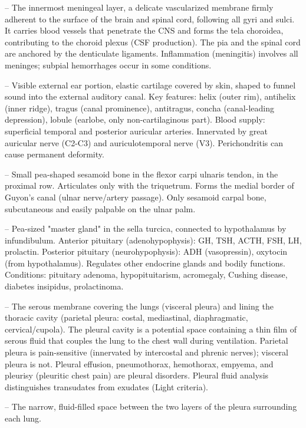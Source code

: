 -- The innermost meningeal layer, a delicate vascularized membrane firmly adherent to the surface of the brain and spinal cord, following all gyri and sulci. It carries blood vessels that penetrate the CNS and forms the tela choroidea, contributing to the choroid plexus (CSF production). The pia and the spinal cord are anchored by the denticulate ligaments. Inflammation (meningitis) involves all meninges; subpial hemorrhages occur in some conditions.

-- Visible external ear portion, elastic cartilage covered by skin, shaped to funnel sound into the external auditory canal. Key features: helix (outer rim), antihelix (inner ridge), tragus (canal prominence), antitragus, concha (canal-leading depression), lobule (earlobe, only non-cartilaginous part). Blood supply: superficial temporal and posterior auricular arteries. Innervated by great auricular nerve (C2-C3) and auriculotemporal nerve (V3). Perichondritis can cause permanent deformity.

-- Small pea-shaped sesamoid bone in the flexor carpi ulnaris tendon, in the proximal row. Articulates only with the triquetrum. Forms the medial border of Guyon's canal (ulnar nerve/artery passage). Only sesamoid carpal bone, subcutaneous and easily palpable on the ulnar palm.

-- Pea-sized "master gland" in the sella turcica, connected to hypothalamus by infundibulum. Anterior pituitary (adenohypophysis): GH, TSH, ACTH, FSH, LH, prolactin. Posterior pituitary (neurohypophysis): ADH (vasopressin), oxytocin (from hypothalamus). Regulates other endocrine glands and bodily functions. Conditions: pituitary adenoma, hypopituitarism, acromegaly, Cushing disease, diabetes insipidus, prolactinoma.

-- The serous membrane covering the lungs (visceral pleura) and lining the thoracic cavity (parietal pleura: costal, mediastinal, diaphragmatic, cervical/cupola). The pleural cavity is a potential space containing a thin film of serous fluid that couples the lung to the chest wall during ventilation. Parietal pleura is pain-sensitive (innervated by intercostal and phrenic nerves); visceral pleura is not. Pleural effusion, pneumothorax, hemothorax, empyema, and pleurisy (pleuritic chest pain) are pleural disorders. Pleural fluid analysis distinguishes transudates from exudates (Light criteria).

-- The narrow, fluid-filled space between the two layers of the pleura surrounding each lung.

